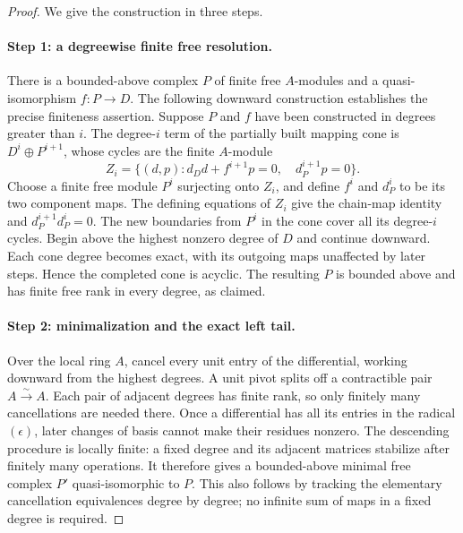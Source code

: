 \begin{proof}
We give the construction in three steps.

\paragraph{Step 1: a degreewise finite free resolution.}
There is a bounded-above complex $P$ of finite free $A$-modules and a
quasi-isomorphism $f:P\to D$. The following downward construction
establishes the precise finiteness assertion. Suppose $P$ and $f$ have
been constructed in degrees greater than $i$. The degree-$i$ term of
the partially built mapping cone is $D^i\oplus P^{i+1}$, whose cycles
are the finite $A$-module
\[
 Z_i=\bigl\{(d,p):
 d_Dd+f^{i+1}p=0,\quad d_P^{i+1}p=0\bigr\}.
\]
Choose a finite free module $P^i$ surjecting onto $Z_i$, and define
$f^i$ and $d_P^i$ to be its two component maps. The defining equations
of $Z_i$ give the chain-map identity and $d_P^{i+1}d_P^i=0$.
The new boundaries from $P^i$ in the cone cover all its degree-$i$
cycles. Begin above the highest nonzero degree of $D$ and continue
downward. Each cone degree becomes exact, with its outgoing maps
unaffected by later steps. Hence the completed cone is acyclic.
The resulting $P$ is bounded above and has finite free rank in every
degree, as claimed.

\paragraph{Step 2: minimalization and the exact left tail.}
Over the local ring $A$, cancel every unit entry of the differential,
working downward from the highest degrees. A unit pivot splits off a
contractible pair $A\xrightarrow{\sim}A$. Each pair of adjacent degrees
has finite rank, so only finitely many cancellations are needed there.
Once a differential has all its entries in the radical $(\epsilon)$,
later changes of basis cannot make their residues nonzero. The
descending procedure is locally finite: a fixed degree and its adjacent
matrices stabilize after finitely many operations. It therefore gives
a bounded-above minimal free complex $P'$ quasi-isomorphic to $P$.
This also follows by tracking the elementary cancellation equivalences
degree by degree; no infinite sum of maps in a fixed degree is required.


\end{proof}
